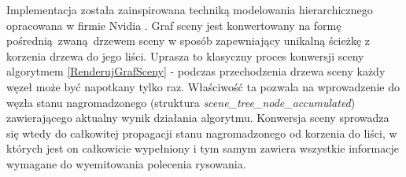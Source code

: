Implementacja została zainspirowana techniką modelowania hierarchicznego opracowana w firmie Nvidia \cite{ADVANCEDSCENEGRAPH}.
Graf sceny jest konwertowany na formę pośrednią zwaną drzewem sceny w sposób zapewniający unikalną ścieżkę z korzenia drzewa do jego liści.
Uprasza to klasyczny proces konwersji sceny algorytmem \ref{RenderujGrafSceny} - podczas przechodzenia drzewa sceny każdy węzeł może być napotkany tylko raz.
Właściwość ta pozwala na wprowadzenie do węzła stanu nagromadzonego (struktura \textit{scene\_tree\_node\_accumulated}) zawierającego aktualny wynik działania algorytmu.
Konwersja sceny sprowadza się wtedy do całkowitej propagacji stanu nagromadzonego od korzenia do liści, w których jest on całkowicie wypełniony i tym samym zawiera wszystkie informacje wymagane do wyemitowania polecenia rysowania.

